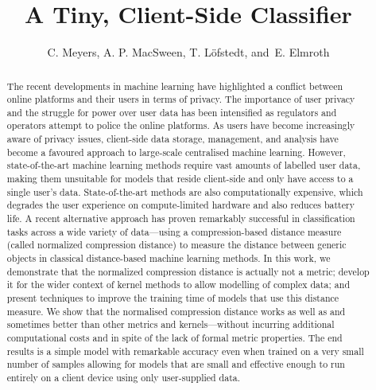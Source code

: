 \documentclass[preprint,12pt]{article}
\begin{document}
\title{A Tiny, Client-Side Classifier}


\author{C. Meyers, A. P. MacSween, T. L\"{o}fstedt, and~E. Elmroth}

\maketitle


\begin{abstract}
The recent developments in machine learning have highlighted a conflict between online platforms and their users in terms of privacy.
The importance of user privacy and the struggle for power over user data has been intensified as regulators and operators attempt to police the online platforms.
As users have become increasingly aware of privacy issues, client-side data storage, management, and analysis have become a favoured approach to large-scale centralised machine learning.
However, state-of-the-art machine learning methods require vast amounts of labelled user data, making them unsuitable for models that reside client-side and only have access to a single user's data.
State-of-the-art methods are also computationally expensive, which degrades the user experience on compute-limited hardware and also reduces battery life.
A recent alternative approach has proven remarkably successful in classification tasks across a wide variety of data---using a compression-based distance measure (called normalized compression distance) to measure the distance between generic objects in classical distance-based machine learning methods.
In this work, we demonstrate that the normalized compression distance is actually not a metric; develop it for the wider context of kernel methods to allow modelling of complex data; and present techniques to improve the training time of models that use this distance measure.
We show that the normalised compression distance works as well as and sometimes better than other metrics and kernels---without incurring additional computational costs and in spite of the lack of formal metric properties.
The end results is a simple model with remarkable accuracy even when trained on a very small number of samples allowing for models that are small and effective enough to run entirely on a client device using only user-supplied data.
\end{abstract}
\end{document}
